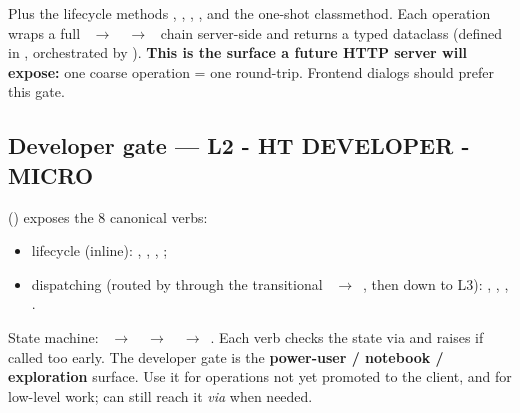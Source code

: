 Plus the lifecycle methods , , , , and the one-shot  classmethod. Each operation wraps a full ~$\rightarrow$~~$\rightarrow$~ chain server-side and returns a typed  dataclass (defined in , orchestrated by ). \textbf{This is the surface a future HTTP server will expose:} one coarse operation = one round-trip. Frontend dialogs should prefer this gate.

\subsection{Developer gate --- L2 - HT DEVELOPER - MICRO}

 () exposes the 8 canonical verbs:

\begin{itemize}
    \item lifecycle (inline): , , , ;
    \item dispatching (routed by  through the transitional ~$\rightarrow$~, then down to L3): , , , .
\end{itemize}

State machine: ~$\rightarrow$~~$\rightarrow$~~$\rightarrow$~. Each verb checks the state via  and raises  if called too early. The developer gate is the \textbf{power-user / notebook / exploration} surface. Use it for operations not yet promoted to the client, and for low-level work;  can still reach it \textit{via}  when needed.
